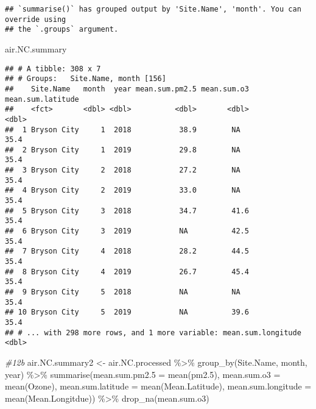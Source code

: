 \documentclass[
]{article}
\newenvironment{Shaded}{\begin{snugshade}}{\end{snugshade}}
\newcommand{\AttributeTok}[1]{\textcolor[rgb]{0.77,0.63,0.00}{#1}}
\newcommand{\CommentTok}[1]{\textcolor[rgb]{0.56,0.35,0.01}{\textit{#1}}}
\newcommand{\FloatTok}[1]{\textcolor[rgb]{0.00,0.00,0.81}{#1}}
\newcommand{\FunctionTok}[1]{\textcolor[rgb]{0.00,0.00,0.00}{#1}}
\newcommand{\NormalTok}[1]{#1}
\newcommand{\OtherTok}[1]{\textcolor[rgb]{0.56,0.35,0.01}{#1}}
\newcommand{\SpecialCharTok}[1]{\textcolor[rgb]{0.00,0.00,0.00}{#1}}
\begin{document}
\begin{verbatim}
## `summarise()` has grouped output by 'Site.Name', 'month'. You can override using
## the `.groups` argument.
\end{verbatim}

\begin{Shaded}
\begin{Highlighting}[]
\NormalTok{air.NC.summary}
\end{Highlighting}
\end{Shaded}

\begin{verbatim}
## # A tibble: 308 x 7
## # Groups:   Site.Name, month [156]
##    Site.Name   month  year mean.sum.pm2.5 mean.sum.o3 mean.sum.latitude
##    <fct>       <dbl> <dbl>          <dbl>       <dbl>             <dbl>
##  1 Bryson City     1  2018           38.9        NA                35.4
##  2 Bryson City     1  2019           29.8        NA                35.4
##  3 Bryson City     2  2018           27.2        NA                35.4
##  4 Bryson City     2  2019           33.0        NA                35.4
##  5 Bryson City     3  2018           34.7        41.6              35.4
##  6 Bryson City     3  2019           NA          42.5              35.4
##  7 Bryson City     4  2018           28.2        44.5              35.4
##  8 Bryson City     4  2019           26.7        45.4              35.4
##  9 Bryson City     5  2018           NA          NA                35.4
## 10 Bryson City     5  2019           NA          39.6              35.4
## # ... with 298 more rows, and 1 more variable: mean.sum.longitude <dbl>
\end{verbatim}

\begin{Shaded}
\begin{Highlighting}[]
\CommentTok{\#12b}
\NormalTok{air.NC.summary2 }\OtherTok{\textless{}{-}}\NormalTok{ air.NC.processed }\SpecialCharTok{\%\textgreater{}\%}
  \FunctionTok{group\_by}\NormalTok{(Site.Name, month, year) }\SpecialCharTok{\%\textgreater{}\%} 
  \FunctionTok{summarise}\NormalTok{(}\AttributeTok{mean.sum.pm2.5 =} \FunctionTok{mean}\NormalTok{(pm2}\FloatTok{.5}\NormalTok{),}
            \AttributeTok{mean.sum.o3 =} \FunctionTok{mean}\NormalTok{(Ozone),}
            \AttributeTok{mean.sum.latitude =} \FunctionTok{mean}\NormalTok{(Mean.Latitude),}
            \AttributeTok{mean.sum.longitude =} \FunctionTok{mean}\NormalTok{(Mean.Longitdue)) }\SpecialCharTok{\%\textgreater{}\%} 
  \FunctionTok{drop\_na}\NormalTok{(mean.sum.o3)}
\end{Highlighting}
\end{Shaded}
\end{document}
